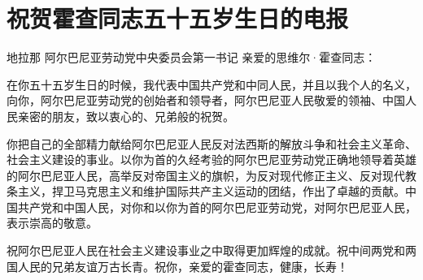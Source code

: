 \section[祝贺霍查同志五十五岁生日的电报（一九六三年十月十五日）]{祝贺霍查同志五十五岁生日的电报}

地拉那
阿尔巴尼亚劳动党中央委员会第一书记
亲爱的思维尔·霍查同志：

在你五十五岁生日的时候，我代表中国共产党和中同人民，并且以我个人的名义，向你，阿尔巴尼亚劳动党的创始者和领导者，阿尔巴尼亚人民敬爱的领袖、中国人民亲密的朋友，致以衷心的、兄弟般的祝贺。

你把自己的全部精力献给阿尔巴尼亚人民反对法西斯的解放斗争和社会主义革命、社会主义建设的事业。以你为首的久经考验的阿尔巴尼亚劳动党正确地领导着英雄的阿尔巴尼亚人民，高举反对帝国主义的旗帜，为反对现代修正主义、反对现代教条主义，捍卫马克思主义和维护国际共产主义运动的团结，作出了卓越的贡献。中国共产党和中国人民，对你和以你为首的阿尔巴尼亚劳动党，对阿尔巴尼亚人民，表示崇高的敬意。

祝阿尔巴尼亚人民在社会主义建设事业之中取得更加辉煌的成就。祝中间两党和两国人民的兄弟友谊万古长青。祝你，亲爱的霍查同志，健康，长寿！


